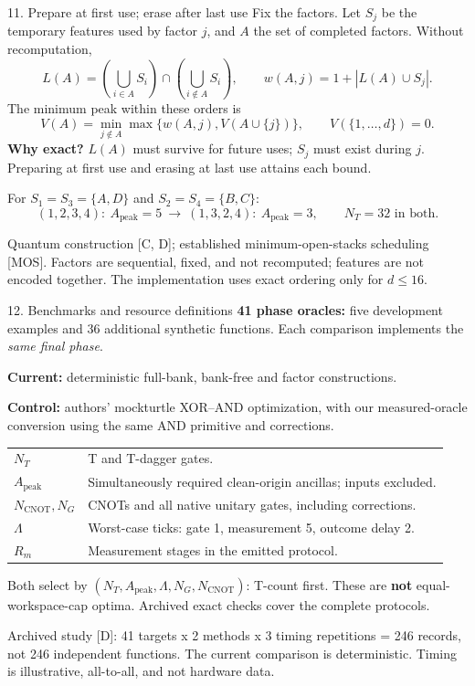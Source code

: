 \documentclass[aspectratio=169,11pt]{beamer}
\newcommand{\partnamebar}{Problem and learned search}
\newcommand{\src}[1]{\par\vfill{\fontsize{6.6}{7.8}\selectfont\color{muted}#1\par}}
\newcommand{\labeltext}[1]{{\color{accent}\bfseries #1}}
\begin{document}
\begin{frame}[t]{11. Prepare at first use; erase after last use}
\small
Fix the factors. Let $S_j$ be the temporary features used by factor $j$, and $A$ the set of completed factors. Without recomputation,
\[
 L(A)=\left(\bigcup_{i\in A}S_i\right)\cap
      \left(\bigcup_{i\notin A}S_i\right),\qquad
 w(A,j)=1+|L(A)\cup S_j|.
\]
The minimum peak within these orders is
\[
 V(A)=\min_{j\notin A}\max\{w(A,j),V(A\cup\{j\})\},
 \qquad V(\{1,\ldots,d\})=0.
\]
\labeltext{Why exact?} $L(A)$ must survive for future uses; $S_j$ must exist during $j$. Preparing at first use and erasing at last use attains each bound.

\smallskip
For $S_1=S_3=\{A,D\}$ and $S_2=S_4=\{B,C\}$:
\[
 (1,2,3,4):\ A_{\mathrm{peak}}=5
 \ \longrightarrow\ 
 (1,3,2,4):\ A_{\mathrm{peak}}=3,
 \qquad N_T=32\text{ in both}.
\]
\src{Quantum construction [C, D]; established minimum-open-stacks scheduling [MOS]. Factors are sequential, fixed, and not recomputed; features are not encoded together. The implementation uses exact ordering only for $d\le16$.}
\end{frame}

\renewcommand{\partnamebar}{Results and conclusion}
\begin{frame}[t]{12. Benchmarks and resource definitions}
\small
\textbf{41 phase oracles:} five development examples and 36 additional synthetic functions. Each comparison implements the \emph{same final phase}.

\smallskip
\textbf{Current:} deterministic full-bank, bank-free and factor constructions.\par
\textbf{Control:} authors' mockturtle XOR--AND optimization, with our measured-oracle conversion using the same AND primitive and corrections.
\begin{center}
\begin{tabular}{@{}ll@{}}
\toprule
$N_T$ & T and T-dagger gates.\\
$A_{\mathrm{peak}}$ & Simultaneously required clean-origin ancillas; inputs excluded.\\
$N_{\mathrm{CNOT}},N_G$ & CNOTs and all native unitary gates, including corrections.\\
$\Lambda$ & Worst-case ticks: gate 1, measurement 5, outcome delay 2.\\
$R_m$ & Measurement stages in the emitted protocol.\\
\bottomrule
\end{tabular}
\end{center}
Both select by $(N_T,A_{\mathrm{peak}},\Lambda,N_G,N_{\mathrm{CNOT}})$: T-count first. These are \textbf{not} equal-workspace-cap optima. Archived exact checks cover the complete protocols.
\src{Archived study [D]: 41 targets x 2 methods x 3 timing repetitions = 246 records, not 246 independent functions. The current comparison is deterministic. Timing is illustrative, all-to-all, and not hardware data.}
\end{frame}
\end{document}
